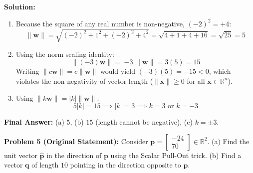 \documentclass[11pt, letterpaper]{article}
\theoremstyle{definition}
\theoremstyle{remark}
\begin{document}
\textbf{Solution:}
\begin{enumerate}[label=(\alph*)]
    \item Because the square of any real number is non-negative, $(-2)^2 = +4$:
    \[
    \|\mathbf{w}\| = \sqrt{(-2)^2 + 1^2 + (-2)^2 + 4^2} = \sqrt{4 + 1 + 4 + 16} = \sqrt{25} = 5
    \]
    \item Using the norm scaling identity:
    \[
    \|(-3)\mathbf{w}\| = |-3|\|\mathbf{w}\| = 3(5) = 15
    \]
    Writing $\|c\mathbf{w}\| = c\|\mathbf{w}\|$ would yield $(-3)(5) = -15 < 0$, which violates the non-negativity of vector length ($\|\mathbf{x}\| \ge 0$ for all $\mathbf{x} \in \mathbb{R}^n$).
    \item Using $\|k\mathbf{w}\| = |k|\|\mathbf{w}\|$:
    \[
    5|k| = 15 \implies |k| = 3 \implies k = 3 \text{ or } k = -3
    \]
\end{enumerate}
\textbf{Final Answer:} (a) $5$, (b) $15$ (length cannot be negative), (c) $k = \pm 3$.

\medskip
\textbf{Problem 5 (Original Statement):} Consider $\mathbf{p} = \begin{bmatrix} -24 \\ 70 \end{bmatrix} \in \mathbb{R}^2$. (a) Find the unit vector $\hat{\mathbf{p}}$ in the direction of $\mathbf{p}$ using the Scalar Pull-Out trick. (b) Find a vector $\mathbf{q}$ of length $10$ pointing in the direction opposite to $\mathbf{p}$.
\end{document}
